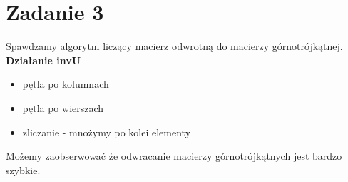 
\section{Zadanie 3}
Spawdzamy algorytm liczący macierz odwrotną do macierzy górnotrójkątnej.\\
\textbf{Działanie invU}
\begin{itemize}
    \item pętla po kolumnach
    \item pętla po wierszach
    \item zliczanie - mnożymy po kolei elementy
\end{itemize}

\begin{center}
\end{center}
Możemy zaobserwować że odwracanie macierzy górnotrójkątnych jest bardzo szybkie.